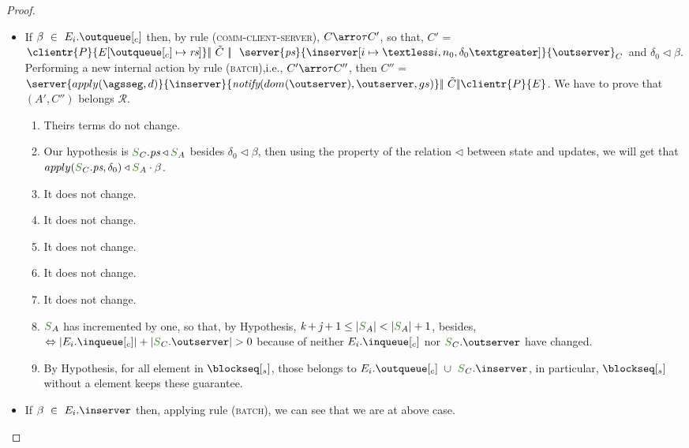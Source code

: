 \begin{proof}
\begin{itemize}
\begin{itemize}
					
					
					\begin{itemize}
						\item If $\beta \ \in\ E_{i}.\outclient$ then, by rule (\textsc{\footnotesize{comm-client-server}}), $C \arroi{\tau} C'$, so that, $C'$ = $\clientr{P}{\update{E}{\outclient}{\tailround}} \bigpar\ \tilde{C} \ \bigpar\ \ \server{\state}{\update{\inserver}{i}{\headerround}}{\outserver}_C$ and $\delta_0 \triangleleft \beta$. Performing a new internal action by rule (\textsc{\footnotesize{batch}}),i.e., $C' \arroi{\tau} C''$, then $C''$ = $\server{\apply{\persistedstate}{d}}{\inserver}{\notify{dom(\outserver)}{\outserver}{gs}}  \bigpar\ \tilde{C} \bigpar \clientr{P}{\stateclient}$. We have to prove that $(A',C'')$ belongs $\mathcal{R}$.
						
						\begin{enumerate}
							\item Theirs terms do not change.
							\item Our hypothesis is $\queuemessage_C.\state \triangleleft \queuemessage_A$ besides $\delta_0 \triangleleft \beta$, then using the property of the relation $\triangleleft$ between state and updates, we will get that $apply(\queuemessage_C.\state,\delta_0) \triangleleft \queuemessage_A \cdot \beta$.
							\item It does not change.
							\item It does not change.
							\item It does not change.
							\item It does not change.
							\item It does not change.
							\item $\queuemessage_A$  has incremented by one, so that, by Hypothesis, $\tknown + \treceivebuffer + 1 \leq |\queuemessage_A| < |\queuemessage_A| + 1$, besides, $\Leftrightarrow |E_{i}.\inclient| + |\queuemessage_C.\outserver| > 0$ because of neither $E_{i}.\inclient$ nor $\queuemessage_C.\outserver$ have changed.
\item By Hypothesis, for all element in $\tsent$, those belongs to $E_{i}.\outclient \ \cup \ \queuemessage_C.\inserver$, in particular, $\tsent$ without a element keeps these guarantee.
						\end{enumerate}
\item If $\beta \ \in\ E_{i}.\inserver$ then, applying rule (\textsc{\footnotesize{batch}}), we can see that we are at above case.
					\end{itemize}
					

\end{itemize}
\end{itemize}
\end{proof}
